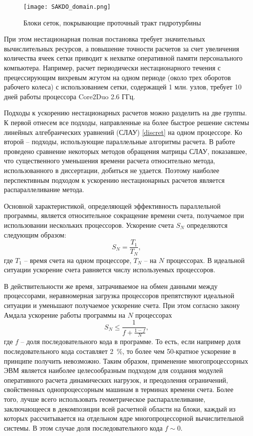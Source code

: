 \begin{figure}[ht!]
  \label{fig1:12}
  \centering                                                                                   
  \texttt{[image: SAKDO\_domain.png]} \\
  \caption{Блоки сеток, покрывающие проточный тракт гидротурбины}
\end{figure}

При этом нестационарная полная постановка требует значительных вычислительных 
ресурсов, а повышение точности расчетов за счет увеличения количества ячеек сетки приводит к нехватке 
оперативной памяти персонального компьютера. Например, расчет периодически нестационарного течения с 
прецессирующим вихревым жгутом на одном периоде (около трех оборотов рабочего колеса) с использованием сетки, 
содержащей  1 млн. узлов, требует 10 дней работы процессора Core2Duo 2.6 ГГц.

Подходы к ускорению нестационарных расчетов можно разделить на две группы. К первой отнесем все подходы, 
направленные на более быстрое решение системы линейных алгебраических уравнений (СЛАУ) 
\eqref{discret} на одном процессоре. Ко второй -- подходы, использующие 
параллельные алгоритмы расчета. В работе \cite{universe} 
проведено сравнение некоторых методов обращения матрицы СЛАУ, показавшее, что 
существенного уменьшения времени расчета относительно метода, использованного в диссертации, добиться не 
удается. Поэтому наиболее перспективным подходом к ускорению нестационарных расчетов является 
распараллеливание метода. 

Основной характеристикой, определяющей эффективность 
параллельной программы, является относительное 
сокращение времени счета, получаемое при использовании нескольких процессоров. 
Ускорение счета $S_N$ определяются следующим образом:
\begin{equation}
  S_N = \frac{T_1}{T_N},
\end{equation}
где $T_1$ -- время счета на одном процессоре, $T_N$ -- на $N$ процессорах. В идеальной ситуации ускорение счета равняется числу 
используемых процессоров.

В действительности же время, затрачиваемое на обмен данными между процессорами, неравномерная загрузка 
процессоров препятствуют идеальной ситуации и уменьшают получаемое ускорение счета.
При этом согласно закону Амдала \cite{amdal} ускорение работы программы на $N$ процессорах
\begin{equation}
  S_N \leq \frac{1}{f+\frac{1-f}{N}},
\end{equation}
где $f$ -- доля последовательного кода в программе. То есть, если например доля последовательного кода 
составляет 2~\%, то более чем 50-кратное ускорение в принципе получить невозможно. Таким образом, применение 
многопроцессорных ЭВМ является наиболее целесообразным подходом для создания модулей оперативного расчета 
динамических нагрузок, и преодоления ограничений, свойственных однопроцессорным машинам в терминах времени 
счета. Более того, лучше всего использовать геометрическое распараллеливание, заключающееся в декомпозиции
всей расчетной области на блоки, каждый из которых рассчитывается на отдельном ядре многопроцессорной 
вычислительной системы. В этом случае доля последовательного кода $f \sim 0$.

